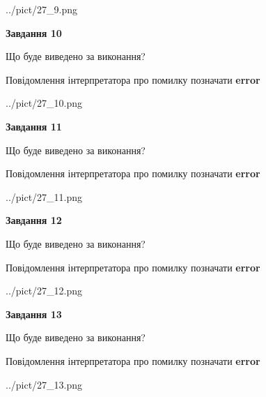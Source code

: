 \documentclass[11pt, ukrainian]{article}
\begin{document}
{\begin {large}
\begin{center}
	{../pict/27_9.png}
\end{center}
\newpage

{\begin {center}\textbf{Завдання 10}\end {center}}\par
Що буде виведено за виконання? \par
Повідомлення інтерпретатора про помилку позначати \textbf{error}

\begin{center}
	{../pict/27_10.png}
\end{center}
\newpage

{\begin {center}\textbf{Завдання 11}\end {center}}\par
Що буде виведено за виконання? \par
Повідомлення інтерпретатора про помилку позначати \textbf{error}

\begin{center}
	{../pict/27_11.png}
\end{center}
\newpage

{\begin {center}\textbf{Завдання 12}\end {center}}\par
Що буде виведено за виконання? \par
Повідомлення інтерпретатора про помилку позначати \textbf{error}

\begin{center}
	{../pict/27_12.png}
\end{center}
\newpage

{\begin {center}\textbf{Завдання 13}\end {center}}\par
Що буде виведено за виконання? \par
Повідомлення інтерпретатора про помилку позначати \textbf{error}

\begin{center}
	{../pict/27_13.png}
\end{center}
\newpage


\end{large}}
\end{document}
